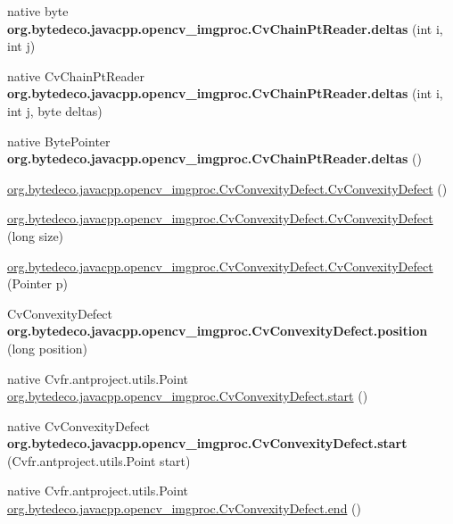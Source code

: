 \begin{DoxyCompactItemize}
native byte {\bfseries org.\+bytedeco.\+javacpp.\+opencv\+\_\+imgproc.\+Cv\+Chain\+Pt\+Reader.\+deltas} (int i, int j)
\item 
\mbox{\label{group__imgproc_gabe75007a635d826599cc4dc184bb489d}} 
native Cv\+Chain\+Pt\+Reader {\bfseries org.\+bytedeco.\+javacpp.\+opencv\+\_\+imgproc.\+Cv\+Chain\+Pt\+Reader.\+deltas} (int i, int j, byte deltas)
\item 
\mbox{\label{group__imgproc_ga1b1a34929239a97f33c9557cb26f3fef}} 
native Byte\+Pointer {\bfseries org.\+bytedeco.\+javacpp.\+opencv\+\_\+imgproc.\+Cv\+Chain\+Pt\+Reader.\+deltas} ()
\item 
\hyperlink{group__imgproc_ga5c579571d2c7ce238f166ac14d106dc0}{org.\+bytedeco.\+javacpp.\+opencv\+\_\+imgproc.\+Cv\+Convexity\+Defect.\+Cv\+Convexity\+Defect} ()
\item 
\hyperlink{group__imgproc_ga1bab8a5b2d8b0d218e13be2962c89bcf}{org.\+bytedeco.\+javacpp.\+opencv\+\_\+imgproc.\+Cv\+Convexity\+Defect.\+Cv\+Convexity\+Defect} (long size)
\item 
\hyperlink{group__imgproc_ga3ad9202789ae5ba03887b3a07a817674}{org.\+bytedeco.\+javacpp.\+opencv\+\_\+imgproc.\+Cv\+Convexity\+Defect.\+Cv\+Convexity\+Defect} (Pointer p)
\item 
\mbox{\label{group__imgproc_ga2b31965ab789a7387e133d5be5b1d6d4}} 
Cv\+Convexity\+Defect {\bfseries org.\+bytedeco.\+javacpp.\+opencv\+\_\+imgproc.\+Cv\+Convexity\+Defect.\+position} (long position)
\item 
native Cv\+fr.antproject.utils.Point \hyperlink{group__imgproc_gac3e9f4d6fda01551329024c0375d6ebb}{org.\+bytedeco.\+javacpp.\+opencv\+\_\+imgproc.\+Cv\+Convexity\+Defect.\+start} ()
\item 
\mbox{\label{group__imgproc_gab4d5d62f7df7e71f9ad218facb69aff2}} 
native Cv\+Convexity\+Defect {\bfseries org.\+bytedeco.\+javacpp.\+opencv\+\_\+imgproc.\+Cv\+Convexity\+Defect.\+start} (Cv\+fr.antproject.utils.Point start)
\item 
native Cv\+fr.antproject.utils.Point \hyperlink{group__imgproc_ga615474a436d4aa8cf5e74cbc1648f50b}{org.\+bytedeco.\+javacpp.\+opencv\+\_\+imgproc.\+Cv\+Convexity\+Defect.\+end} ()
\item 
\mbox{\label{group__imgproc_ga7ae2647f6d1d6e7f6bf5f965bba3cb57}} 

\end{DoxyCompactItemize}
